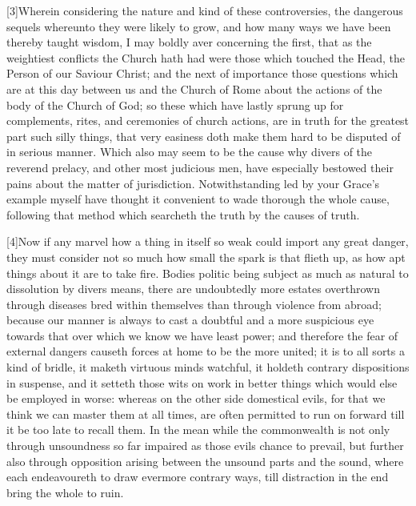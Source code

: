 [3]Wherein considering the nature and kind of these controversies, the dangerous sequels whereunto they were likely to grow, and how many ways we have been thereby taught wisdom, I may boldly aver concerning the first, that as the weightiest conflicts the Church hath had were those which touched the Head, the Person of our Saviour Christ; and the next of importance those questions which are at this day between us and the Church of Rome about the actions of the body of the Church of God; so these which have lastly sprung up for complements, rites, and ceremonies of church actions, are in truth for the greatest part such silly things, that very easiness doth make them hard to be disputed of in serious manner. Which also may seem to be the cause why divers of the reverend prelacy, and other most judicious men, have especially bestowed their pains about the matter of jurisdiction. Notwithstanding led by your Grace’s example myself have thought it convenient to wade thorough the whole cause, following that method which searcheth the truth by the causes of truth.

[4]Now if any marvel how a thing in itself so weak could import any great danger, they must consider not so much how small the spark is that flieth up, as how apt things about it are to take fire. Bodies politic being subject as much as natural to dissolution by divers means, there are undoubtedly more estates overthrown through diseases bred within themselves than through violence from abroad; because our manner is always to cast a doubtful and a more suspicious eye towards that over which we know we have least power; and therefore the fear of external dangers causeth forces at home to be the more united; it is to all sorts a kind of bridle, it maketh virtuous minds watchful, it holdeth contrary dispositions in suspense, and it setteth those wits on work in better things which would else be employed in worse: whereas on the other side domestical evils, for that we think we can master them at all times, are often permitted to run on forward till it be too late to recall them. In the mean while the commonwealth is not only through unsoundness so far impaired as those evils chance to prevail, but further also through opposition arising between the unsound parts and the sound, where each endeavoureth to draw evermore contrary ways, till distraction in the end bring the whole to ruin.

